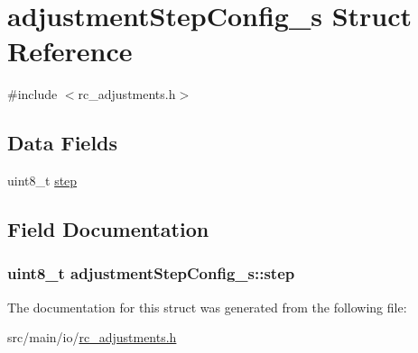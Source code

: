 \hypertarget{structadjustmentStepConfig__s}{\section{adjustment\+Step\+Config\+\_\+s Struct Reference}
\label{structadjustmentStepConfig__s}
}


{\ttfamily \#include $<$rc\+\_\+adjustments.\+h$>$}

\subsection*{Data Fields}
\begin{DoxyCompactItemize}
\item 
uint8\+\_\+t \hyperlink{structadjustmentStepConfig__s_a4f04f42d7265f2ad269531d8c906199b}{step}
\end{DoxyCompactItemize}


\subsection{Field Documentation}
\hypertarget{structadjustmentStepConfig__s_a4f04f42d7265f2ad269531d8c906199b}{
\subsubsection[{step}]{\setlength{\rightskip}{0pt plus 5cm}uint8\+\_\+t adjustment\+Step\+Config\+\_\+s\+::step}}\label{structadjustmentStepConfig__s_a4f04f42d7265f2ad269531d8c906199b}


The documentation for this struct was generated from the following file\+:\begin{DoxyCompactItemize}
\item 
src/main/io/\hyperlink{io_2rc__adjustments_8h}{rc\+\_\+adjustments.\+h}\end{DoxyCompactItemize}
